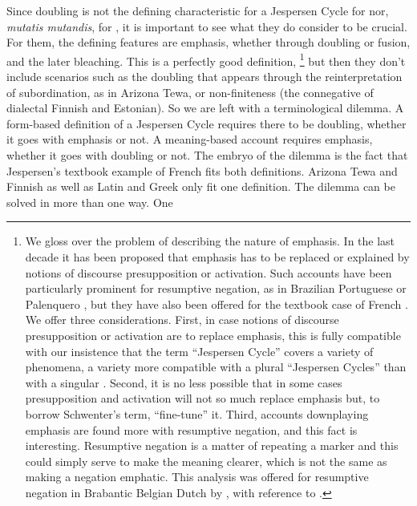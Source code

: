 ﻿\documentclass[output=paper]{langsci/langscibook}
\begin{document}
Since doubling is not the defining characteristic for a Jespersen Cycle for
\textcites{Chatzopoulou2012}{Chatzopoulou2015}{Chatzopoulou2019} nor,
\textit{mutatis mutandis},
for \textcites{Schwegler1983}{Schwegler1988}, it is important to see what they do consider to
be crucial. For them, the defining features are emphasis, whether through
doubling or fusion, and the later bleaching. This is a perfectly good
definition,%
%
    \footnote{We gloss over the problem of describing the nature of
    emphasis. In the last decade it has been proposed that emphasis has to
    be replaced or explained by notions of discourse presupposition or
    activation.  Such accounts have been particularly prominent for
    resumptive negation, as in Brazilian Portuguese
    \parencite{Schwenter2006} or Palenquero \parencite{Schwegler1991}, but
    they have also been offered for the textbook case of French
    \parencites{MosegaardHansen2009}{Larrivee2010}. We offer three
    considerations. First, in case notions of discourse presupposition or
    activation are to replace emphasis, this is fully compatible with our
    insistence that the term ``Jespersen Cycle'' covers a variety of
    phenomena, a variety more compatible with a plural ``Jespersen Cycles''
    than with a singular \parencite{Auwera2009}. Second, it is no less
    possible that in some cases presupposition and activation will not so
    much replace emphasis but, to borrow Schwenter's term, ``fine-tune''
    it. Third, accounts downplaying emphasis are found more with resumptive
    negation, and this fact is interesting. Resumptive negation is a matter
    of repeating a marker and this could simply serve to make the meaning
    clearer, which is not the same as making a negation emphatic. This
    analysis was offered for resumptive negation in Brabantic Belgian Dutch
    by \textcite[52]{Auwera2009}, with reference to
    \textcite[76]{Pauwels1974}.} %
%
but then they don't include scenarios such as the doubling that appears
through the reinterpretation of subordination, as in Arizona Tewa,
or non-finiteness (the connegative of dialectal Finnish and
Estonian). So we are left with a terminological
dilemma. A form-based definition of a Jespersen Cycle requires there to be
doubling, whether it goes with emphasis or not. A meaning-based account
requires emphasis, whether it goes with doubling or not. The embryo of the
dilemma is the fact that Jespersen's textbook example of French fits both
definitions. Arizona Tewa and Finnish as well as Latin and Greek only fit
one definition. The dilemma can be solved in more than one way. One
\end{document}
